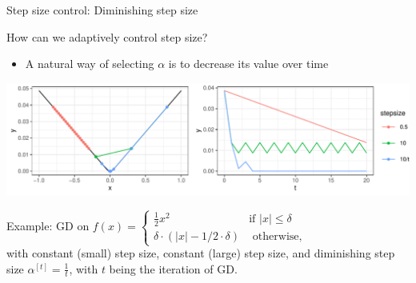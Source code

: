 \documentclass[11pt,compress,t,notes=noshow, xcolor=table]{beamer}
\begin{document}
	
	\begin{vbframe}{Step size control: Diminishing step size}

	How can we adaptively control step size? 
	
		\begin{itemize}
			\item A natural way of selecting $\alpha$ is to decrease its value over time
		\end{itemize}

		\begin{center}
			\includegraphics[width = 1\textwidth]{figure_man/fixed_vs_adaptive.pdf} \\
			\begin{footnotesize} Example: GD on $f(x) = \begin{cases} \frac{1}{2} x^2 & \text{if } |x| \le \delta \\  \delta \cdot (|x|- 1 / 2 \cdot \delta) & \text{ otherwise,}\end{cases}$ \\ with constant (small) step size, constant (large) step size, and diminishing step size $\alpha^{[t]} = \frac{1}{t}$, with $t$ being the iteration of GD. 
			\end{footnotesize}
		\end{center}
		
	\end{vbframe}	
	
\end{document}
